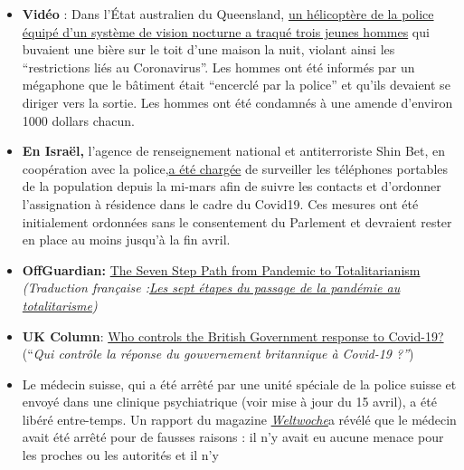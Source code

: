 \begin{itemize}
\tightlist
\item
  \textbf{Vidéo} : Dans l'État australien du Queensland,
  \href{https://twitter.com/Independent/status/1252911273597120513}{un
  hélicoptère de la police équipé d'un système de vision nocturne a
  traqué trois jeunes hommes} qui buvaient une bière sur le toit d'une
  maison la nuit, violant ainsi les ``restrictions liés au
  Coronavirus''. Les hommes ont été informés par un mégaphone que le
  bâtiment était ``encerclé par la police'' et qu'ils devaient se
  diriger vers la sortie. Les hommes ont été condamnés à une amende
  d'environ 1000 dollars chacun.
\item
  \textbf{En Israël,} l'agence de renseignement national et
  antiterroriste Shin Bet, en coopération avec la
  police,\href{https://www.jewishpress.com/news/the-courts/state-to-high-court-even-more-shin-bet-involvement-in-fighting-the-coronavirus/2020/04/14/}{a
  été chargée} de surveiller les téléphones portables de la population
  depuis la mi-mars afin de suivre les contacts et d'ordonner
  l'assignation à résidence dans le cadre du Covid19. Ces mesures ont
  été initialement ordonnées sans le consentement du Parlement et
  devraient rester en place au moins jusqu'à la fin avril.
\item
  \textbf{OffGuardian:}
  \href{https://off-guardian.org/2020/04/23/the-seven-step-path-from-pandemic-to-totalitarianism/}{The
  Seven Step Path from Pandemic to Totalitarianism}\\
  \emph{(Traduction française
  :\href{http://le-blog-sam-la-touch.over-blog.com/les-sept-etapes-du-passage-de-la-pandemie-au-totalitarisme-off-guardian}{Les
  sept étapes du passage de la pandémie au totalitarisme})}
\item
  \textbf{UK Column}:
  \href{https://www.ukcolumn.org/article/who-controls-british-government-response-covid19-part-one}{Who
  controls the British Government response to Covid-19?}\\
  (``\emph{Qui contrôle la réponse du gouvernement britannique à
  Covid-19 ?''})
\item
  Le médecin suisse, qui a été arrêté par une unité spéciale de la
  police suisse et envoyé dans une clinique psychiatrique (voir mise à
  jour du 15 avril), a été libéré entre-temps. Un rapport du magazine
  \href{https://uncut-news.ch/wp-content/uploads/2020/04/Wer-l\%C3\%B6ste-den-Fehlalarm-aus.pdf}{\emph{Weltwoche}}a
  révélé que le médecin avait été arrêté pour de fausses raisons : il
  n'y avait eu aucune menace pour les proches ou les autorités et il n'y

\end{itemize}
